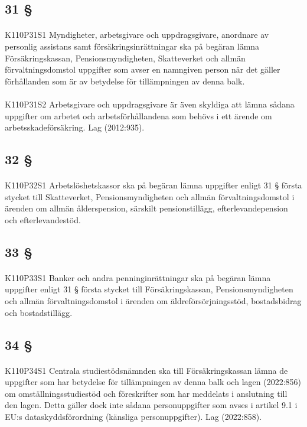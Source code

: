 \documentclass[a4paper,notitlepage,openany,10pt]{book}
\begin{document}
\subsection*{31 §}
\paragraph*{}
{\tiny K110P31S1}
Myndigheter, arbetsgivare och uppdragsgivare, anordnare av personlig assistans samt försäkringsinrättningar ska på begäran lämna Försäkringskassan, Pensionsmyndigheten, Skatteverket och allmän förvaltningsdomstol uppgifter som avser en namngiven person när det gäller förhållanden som är av betydelse för tillämpningen av denna balk.
\paragraph*{}
{\tiny K110P31S2}
Arbetsgivare och uppdragsgivare är även skyldiga att lämna sådana uppgifter om arbetet och arbetsförhållandena som behövs i ett ärende om arbetsskadeförsäkring.
Lag (2012:935).
\subsection*{32 §}
\paragraph*{}
{\tiny K110P32S1}
Arbetslöshetskassor ska på begäran lämna uppgifter enligt 31 § första stycket till Skatteverket, Pensionsmyndigheten och allmän förvaltningsdomstol i ärenden om allmän ålderspension, särskilt pensionstillägg, efterlevandepension och efterlevandestöd.
\subsection*{33 §}
\paragraph*{}
{\tiny K110P33S1}
Banker och andra penninginrättningar ska på begäran lämna uppgifter enligt 31 § första stycket till Försäkringskassan, Pensionsmyndigheten och allmän förvaltningsdomstol i ärenden om äldreförsörjningsstöd, bostadsbidrag och bostadstillägg.
\subsection*{34 §}
\paragraph*{}
{\tiny K110P34S1}
Centrala studiestödsnämnden ska till Försäkringskassan lämna de uppgifter som har betydelse för tillämpningen av denna balk och lagen (2022:856) om omställningsstudiestöd och föreskrifter som har meddelats i anslutning till den lagen. Detta gäller dock inte sådana personuppgifter som avses i artikel 9.1 i EU:s dataskyddsförordning (känsliga personuppgifter).
Lag (2022:858).
\end{document}
